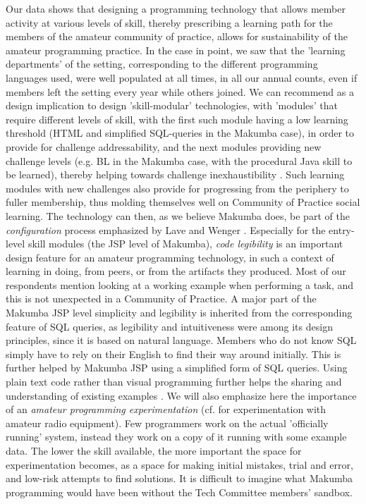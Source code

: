 \documentclass{sig-alt-release2}
\begin{document}
Our data shows that designing a programming technology that allows member activity at various levels of skill, thereby prescribing a learning path for the members of the amateur community of practice, allows for sustainability of the amateur programming practice. In the case in point, we saw that the 'learning departments' of the setting, corresponding to the different programming languages used, were well populated at all times, in all our annual counts,  even if members left the setting every year while others joined. We can recommend as a design implication to design 'skill-modular' technologies, with 'modules' that require different levels of skill, with the first such module having a low learning threshold (HTML and simplified SQL-queries in the Makumba case), in order to provide for challenge addressability, and the next modules providing new challenge levels (e.g. BL in the Makumba case, with the procedural Java skill to be learned), thereby helping towards challenge inexhaustibility \cite{bogdan_bowers07}. Such learning modules with new challenges also provide for progressing from the periphery to fuller membership, thus molding themselves well on Community of Practice social learning. The technology can then, as we believe Makumba does, be part of the \textit{configuration} process emphasized by Lave and Wenger \cite{lave_wenger91}. Especially for the entry-level skill modules (the JSP level of Makumba), \textit{code legibility} is an important design feature for an amateur programming technology, in such a context of learning in doing, from peers, or from the artifacts they produced. 
Most of our respondents mention looking at a working example when performing a task, and this is not unexpected in a Community of Practice. A major part of the Makumba JSP level simplicity and legibility is inherited from the corresponding feature of SQL queries, as legibility and intuitiveness were among its design principles, since it is based on natural language. Members who do not know SQL simply have to rely on their English to find their way around initially. This is further helped by Makumba JSP using a simplified form of SQL queries. Using plain text code rather than visual programming further helps the sharing and understanding of existing examples \cite{yamauchi00}. We will also emphasize here the importance of an \textit{amateur programming experimentation} (cf.  \cite{bogdan_bowers07} for experimentation with amateur radio equipment).
Few programmers work on the actual 'officially running' system, instead they work on a copy of it running with some example data. The lower the skill available, the more important the space for experimentation becomes, as a space for making initial mistakes, trial and error, and low-risk attempts to find solutions. It is difficult to imagine what Makumba programming would have been without the Tech Committee members' sandbox.
\end{document}
